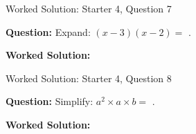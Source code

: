 \documentclass{beamer}
\newcommand{\ablank}[1]{%
  \alt<2>{\textcolor{red}{#1}}{\underline{\phantom{#1}}}%
}
\newcommand{\ashow}[1]{\uncover<2->{\textcolor{red}{\small #1}}}
\begin{document}
\begin{frame}{Worked Solution: Starter 4, Question 7}

\textbf{Question:} Expand: $(x-3)(x-2)=$\ablank{$x^2-5x+6$}.

\textbf{Worked Solution:} \ashow{Use FOIL: $x^2-2x-3x+6=x^2-5x+6$.}

\end{frame}

\begin{frame}{Worked Solution: Starter 4, Question 8}

\textbf{Question:} Simplify: $a^2 \times a \times b=$\ablank{$a^3b$}.

\textbf{Worked Solution:} \ashow{Combine the powers of $a$: $a^2\times a=a^3$, then multiply by $b$: $a^3b$.}

\end{frame}
\end{document}
